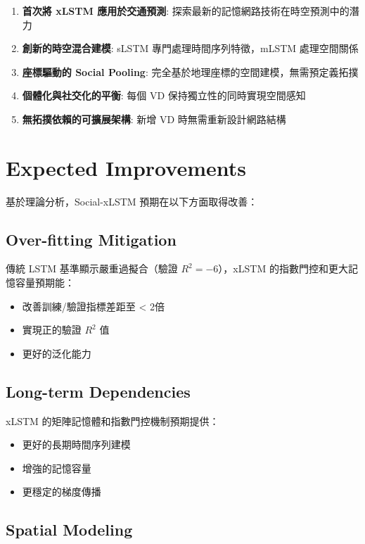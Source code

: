 \documentclass[11pt,a4paper]{article}
\begin{document}
\begin{enumerate}
\item \textbf{首次將 xLSTM 應用於交通預測}: 探索最新的記憶網路技術在時空預測中的潛力

\item \textbf{創新的時空混合建模}: sLSTM 專門處理時間序列特徵，mLSTM 處理空間關係

\item \textbf{座標驅動的 Social Pooling}: 完全基於地理座標的空間建模，無需預定義拓撲

\item \textbf{個體化與社交化的平衡}: 每個 VD 保持獨立性的同時實現空間感知

\item \textbf{無拓撲依賴的可擴展架構}: 新增 VD 時無需重新設計網路結構
\end{enumerate}

\section{Expected Improvements}

基於理論分析，Social-xLSTM 預期在以下方面取得改善：

\subsection{Over-fitting Mitigation}

傳統 LSTM 基準顯示嚴重過擬合（驗證 $R^2 = -6$），xLSTM 的指數門控和更大記憶容量預期能：
\begin{itemize}
\item 改善訓練/驗證指標差距至 < 2倍
\item 實現正的驗證 $R^2$ 值
\item 更好的泛化能力
\end{itemize}

\subsection{Long-term Dependencies}

xLSTM 的矩陣記憶體和指數門控機制預期提供：
\begin{itemize}
\item 更好的長期時間序列建模
\item 增強的記憶容量
\item 更穩定的梯度傳播
\end{itemize}

\subsection{Spatial Modeling}
\end{document}
